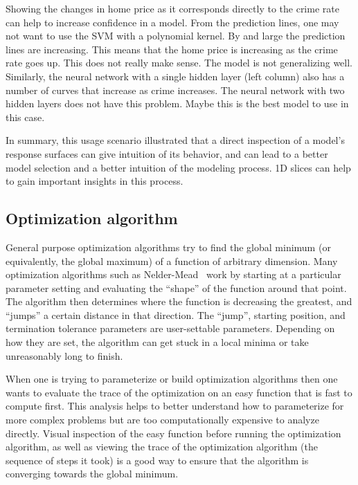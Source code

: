 Showing the changes in home price as it corresponds directly to the crime rate
can help to increase confidence in a model.  From the prediction lines, one may
not want to use the SVM with a polynomial kernel. By and large the prediction
lines are increasing. This means that the home price is increasing as the crime
rate goes up. This does not really make sense. The model is not generalizing
well. Similarly, the neural network with a single hidden layer (left column)
also has a number of curves that increase as crime increases. The neural
network with two hidden layers does not have this problem. Maybe this is the
best model to use in this case.

In summary, this usage scenario illustrated that a direct inspection of a
model's response surfaces can give intuition of its behavior, and can lead to a
better model selection and a better intuition of the modeling process. 1D
slices can help to gain important insights in this process. 

\subsection{Optimization algorithm}
\label{sec:optimization}

General purpose optimization algorithms try to find the global minimum (or
equivalently, the global maximum) of a function of arbitrary dimension.  Many
optimization algorithms such as Nelder-Mead~\cite{Nelder:1965} work by starting
at a particular parameter setting and evaluating the ``shape'' of the function
around that point.  The algorithm then determines where the function is
decreasing the greatest, and ``jumps'' a certain distance in that direction.
The ``jump'', starting position, and termination tolerance parameters are
user-settable parameters. Depending on how they are set, the algorithm can get
stuck in a local minima or take unreasonably long to finish.

When one is trying to parameterize or build optimization algorithms then
one wants to evaluate the trace of the optimization on an easy function
that is fast to compute first. This analysis helps to better understand how to parameterize for more complex problems
but are
too computationally expensive to analyze directly. 
Visual inspection of the easy function before running the optimization algorithm, as well as
viewing the trace of the optimization algorithm (the sequence of steps it took) is a good way to ensure that the algorithm is converging towards the global
minimum. 

